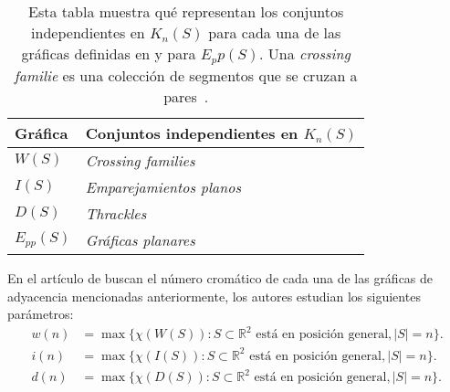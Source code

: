 %
\begin{table}
  \centering
  \begin{tabular}{|l|l|}
    \hline
    Gráfica   & Conjuntos independientes en $K_n(S)$    \\ \hline \hline
    $W(S)$    & \emph{Crossing families}        \\ \hline
    $I(S)$    & \emph{Emparejamientos planos}           \\ \hline
    $D(S)$    & \emph{Thrackles}                        \\ \hline
    $E_{pp}(S)$ & \emph{Gráficas planares}                   \\ \hline
  \end{tabular}
  \caption{Esta tabla muestra qué representan los conjuntos independientes en
  $K_n(S)$ para cada una de las gráficas definidas en \cite{Araujo2005} y para
  $E_pp(S)$. Una \emph{crossing familie} es una colección de segmentos
  que se cruzan a pares~\cite{Lara2019}. }
  \label{table:graficasincidencia}
\end{table}
En el artículo de \cite{Araujo2005} buscan el número cromático de cada una de
las gráficas de adyacencia mencionadas anteriormente, los autores estudian los
siguientes parámetros:
  \begin{align*}
    w(n) &= \max\{\chi(W(S)): S\subset \mathbb{R}^2 \text{ está en posición general}, |S|=n\}. \\
    i(n) &= \max\{\chi(I(S)): S\subset \mathbb{R}^2 \text{ está en posición general}, |S|=n\}. \\
    d(n) &= \max\{\chi(D(S)): S\subset \mathbb{R}^2 \text{ está en posición general}, |S|=n\}. \\
  \end{align*}
